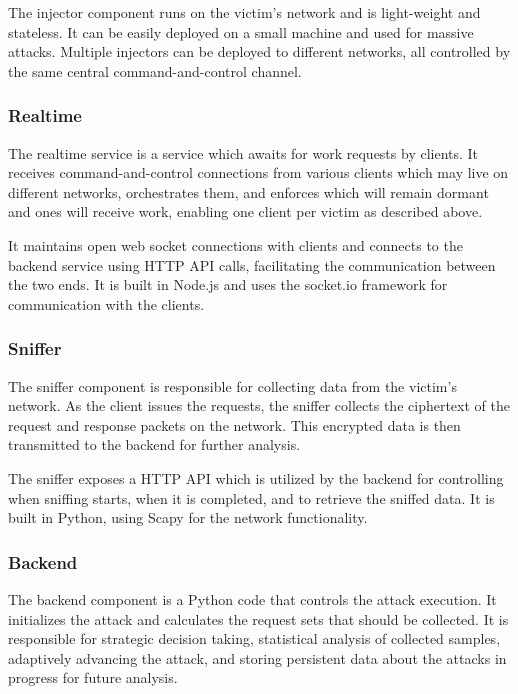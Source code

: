 The injector component runs on the victim's network and is light-weight and
stateless. It can be easily deployed on a small machine and used for massive
attacks. Multiple injectors can be deployed to different networks, all
controlled by the same central command-and-control channel.

\subsubsection{Realtime}

The realtime service is a service which awaits for work requests by clients. It
receives command-and-control connections from various clients which may live on
different networks, orchestrates them, and enforces which will remain dormant
and ones will receive work, enabling one client per victim as described above.

It maintains open web socket connections with clients and connects to the
backend service using HTTP API calls, facilitating the communication between the
two ends. It is built in Node.js and uses the socket.io framework for
communication with the clients.

\subsubsection{Sniffer}

The sniffer component is responsible for collecting data from the victim's
network. As the client issues the requests, the sniffer collects the ciphertext
of the request and response packets on the network. This encrypted data is then
transmitted to the backend for further analysis.

The sniffer exposes a HTTP API which is utilized by the backend for controlling
when sniffing starts, when it is completed, and to retrieve the sniffed data. It
is built in Python, using Scapy for the network functionality.

\subsubsection{Backend}

The backend component is a Python code that controls the attack execution. It
initializes the attack and calculates the request sets that should be
collected. It is responsible for strategic decision taking, statistical
analysis of collected samples, adaptively advancing the attack, and storing
persistent data about the attacks in progress for future analysis.

